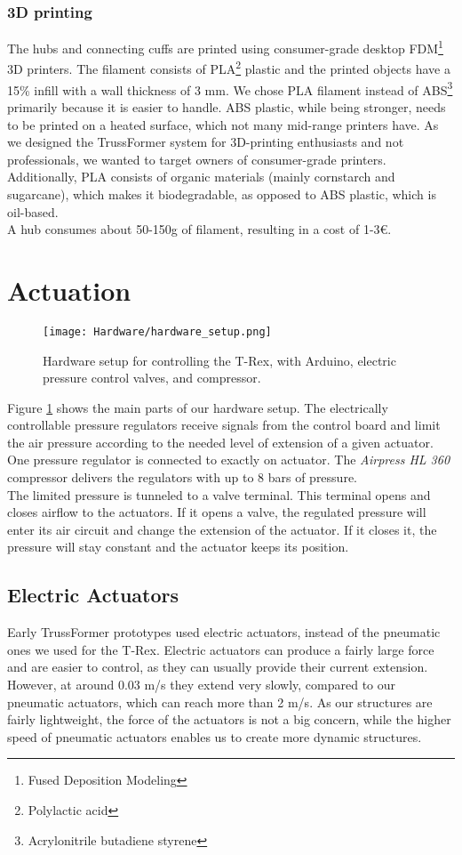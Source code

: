 \subsubsection{3D printing}
The hubs and connecting cuffs are printed using consumer-grade desktop FDM\footnote{Fused Deposition Modeling} 3D printers. The filament consists of PLA\footnote{Polylactic acid} plastic and the printed objects have a 15\% infill with a wall thickness of 3 mm. We chose PLA filament instead of ABS\footnote{Acrylonitrile butadiene styrene} primarily because it is easier to handle. ABS plastic, while being stronger, needs to be printed on a heated surface, which not many mid-range printers have. As we designed the TrussFormer system for 3D-printing enthusiasts and not professionals, we wanted to target owners of consumer-grade printers. Additionally, PLA consists of organic materials (mainly cornstarch and sugarcane), which makes it biodegradable, as opposed to ABS plastic, which is oil-based.\\
A hub consumes about 50-150g of filament, resulting in a cost of 1-3€.

\section{Actuation}
\begin{figure}[ht!]
    \texttt{[image: Hardware/hardware\_setup.png]}
    \centering
    \caption{Hardware setup for controlling the T-Rex, with Arduino, electric pressure control valves, and compressor.}
    \label{fig:hardware_setup}
\end{figure}
Figure \ref{fig:hardware_setup} shows the main parts of our hardware setup. The electrically controllable pressure regulators receive signals from the control board and limit the air pressure according to the needed level of extension of a given actuator. One pressure regulator is connected to exactly on actuator. The \textit{Airpress HL 360} compressor delivers the regulators with up to 8 bars of pressure.\\
The limited pressure is tunneled to a valve terminal. This terminal opens and closes airflow to the actuators. If it opens a valve, the regulated pressure will enter its air circuit and change the extension of the actuator. If it closes it, the pressure will stay constant and the actuator keeps its position.

\subsection{Electric Actuators}
Early TrussFormer prototypes used electric actuators, instead of the pneumatic ones we used for the T-Rex. Electric actuators can produce a fairly large force and are easier to control, as they can usually provide their current extension. However, at around 0.03 m/s they extend very slowly, compared to our pneumatic actuators, which can reach more than 2 m/s. As our structures are fairly lightweight, the force of the actuators is not a big concern, while the higher speed of pneumatic actuators enables us to create more dynamic structures.

